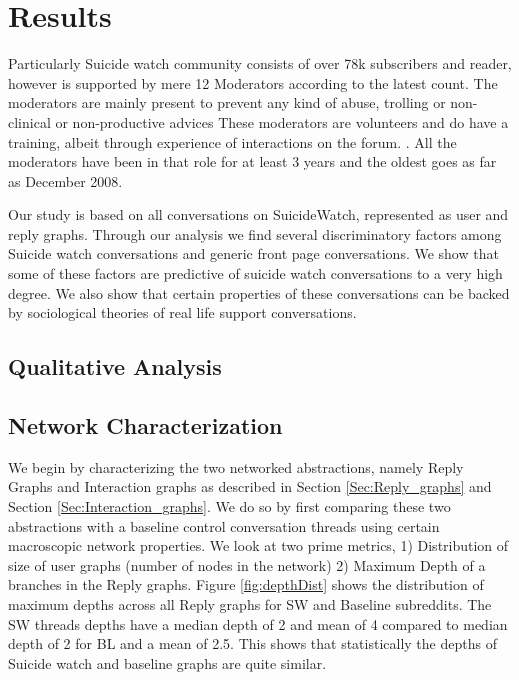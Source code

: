 \section{Results}
Particularly Suicide watch community consists of over 78k subscribers and reader, however is supported by mere 12 Moderators according to the latest count. The moderators are mainly present to prevent any kind of abuse, trolling or non-clinical or non-productive advices  These moderators are volunteers and do have a training, albeit through experience of interactions on the forum. . All the moderators have been in that role for at least 3 years and the oldest goes as far as December 2008. 

Our study is based on all conversations on SuicideWatch, represented as user and reply graphs. 
Through our analysis we find several discriminatory factors among Suicide watch conversations and generic front page conversations. We show that some of these factors are predictive of suicide watch conversations to a very high degree. We also show that certain properties of these conversations can be backed by sociological theories of real life support conversations. 

\subsection{Qualitative Analysis}

\subsection{Network Characterization}
We begin by characterizing the two networked abstractions, namely Reply Graphs and Interaction graphs as described in Section \ref{Sec:Reply_graphs} and Section \ref{Sec:Interaction_graphs}. We do so by first comparing these two abstractions with a baseline control conversation threads using certain macroscopic network properties. 
We look at two prime metrics, 1) Distribution of size of user graphs (number of nodes in the network)  2) Maximum Depth of a branches in the Reply graphs. 
Figure \ref{fig:depthDist} shows the distribution of maximum depths across all Reply graphs for SW and Baseline subreddits. The SW threads depths have a median depth of 2 and mean of 4 compared to median depth of 2 for BL and a mean of 2.5. This shows that statistically the depths of Suicide watch and baseline graphs are quite similar.


